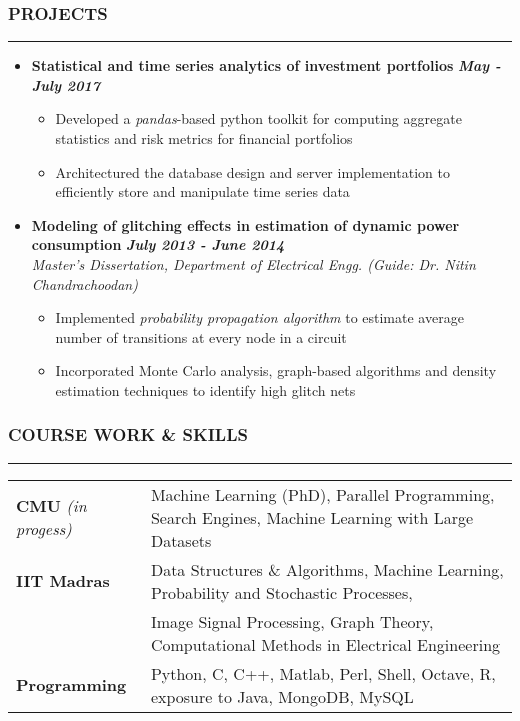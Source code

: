 \documentclass[10pt,a4paper,English]{article}
\newcommand\roottitle[1]{\vspace{-4mm}\subsubsection*{\uppercase{#1}}\vspace{-0.3em}\nopagebreak[4]\hrule\vspace{4mm}}
\newcommand\itemyear[1]{\hfill \textbf{\emph{\color{itemyear} #1}}}
\newcommand\itemenv{\setlength\itemsep{0.5pt} \addtolength{\itemindent}{-5mm}\vspace{-1.5mm}}
\begin{document}
\roottitle{Projects}
\begin{itemize} \itemenv
    \item \textbf{Statistical and time series analytics of investment portfolios} \itemyear{May - July 2017}
        \begin{itemize} \itemenv
            \item Developed a \textit{pandas}-based python toolkit for computing aggregate statistics and risk metrics for financial portfolios
            \item Architectured the database design and server implementation to efficiently store and manipulate time series data
        \end{itemize}
    \item \textbf{Modeling of glitching effects in estimation of dynamic power consumption} \itemyear{July 2013 - June 2014} \\
    \emph{Master's Dissertation, Department of Electrical Engg. (Guide: Dr. Nitin Chandrachoodan)}
        \begin{itemize} \itemenv
            \item Implemented \textit{probability propagation algorithm} to estimate average number of transitions at every node in a circuit
            \item Incorporated Monte Carlo analysis, graph-based algorithms and density estimation techniques to identify high glitch nets
        \end{itemize}
\end{itemize}

\roottitle{Course Work \& Skills}
\vspace{-2mm}
\renewcommand{\arraystretch}{1.2}
\setlength\tabcolsep{0pt}
\begin{tabularx}{\textwidth}{ l @{ - } X }
\textbf{CMU} \textit{(in progess)}  & Machine Learning (PhD), Parallel Programming, Search Engines, Machine Learning with Large Datasets \\
\textbf{IIT Madras}                 & Data Structures \& Algorithms, Machine Learning, Probability and Stochastic Processes, \\
                                    & Image Signal Processing, Graph Theory, Computational Methods in Electrical Engineering \\
\textbf{Programming}                & Python, C, C++, Matlab, Perl, Shell, Octave, R, exposure to Java, MongoDB, MySQL
\end{tabularx}
\vspace{2mm}
\end{document}
